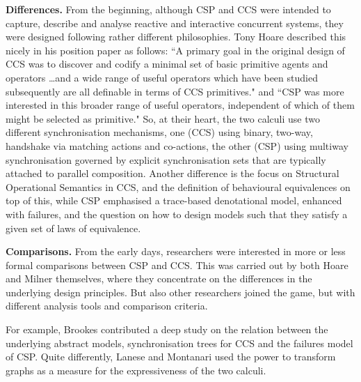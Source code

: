 \documentclass[copyright,creativecommons]{eptcs}
\begin{document}
\vspace{0.3em}
\noindent
\textbf{Differences.}\;
From the beginning, although CSP \cite{hoare:78csp} and CCS \cite{CCS} were intended to capture, describe and analyse reactive and interactive concurrent systems, they were designed following rather different philosophies. Tony Hoare described this nicely in his position paper \cite{Hoare2006209} as follows: ``A primary goal in the original design of CCS was to discover and codify a minimal set of basic primitive agents and operators \dots and a wide range of useful operators which have been studied subsequently are all definable in terms of CCS primitives." and ``CSP was more interested in this broader range of useful operators, independent of which of them might be selected as primitive." So, at their heart, the two calculi use two different synchronisation mechanisms, one (CCS) using binary, \ie two-way, handshake via matching actions and co-actions, the other (CSP) using multiway synchronisation governed by explicit synchronisation sets that are typically attached to parallel composition. Another difference is the focus on Structural Operational Semantics in CCS, and the definition of behavioural equivalences on top of this, while CSP emphasised a trace-based denotational model, enhanced with failures, and the question on how to design models such that they satisfy a given set of laws of equivalence.

\vspace{0.3em}
\noindent
\textbf{Comparisons.}\;
From the early days, researchers were interested in more or less formal comparisons between CSP and CCS. This was carried out by both Hoare \cite{Hoare2006209} and Milner \cite{DBLP:conf/ifip/Milner86} themselves, where they concentrate on the differences in the underlying design principles. But also other researchers joined the game, but with different analysis tools and comparison criteria. 

For example, Brookes \cite{DBLP:conf/icalp/Brookes83} contributed a deep study on the relation between the underlying abstract models, synchronisation trees for CCS and the failures model of CSP. Quite differently, Lanese and Montanari \cite{Lanese200655} used the power to transform graphs as a measure for the expressiveness of the two calculi. 
\end{document}

